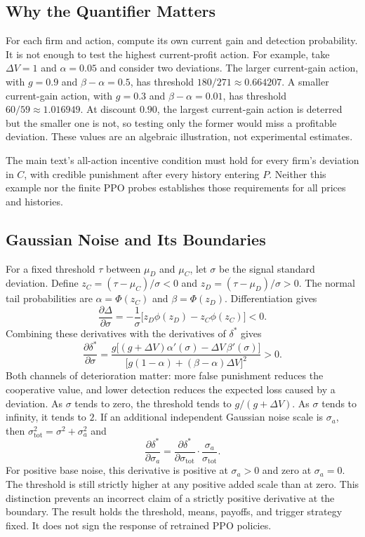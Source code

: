 \documentclass{article}
\begin{document}
\subsection{Why the Quantifier Matters}

For each firm and action, compute its own current gain and detection probability. It is not enough to test the highest current-profit action. For example, take $\Delta V = 1$ and $\alpha = 0.05$ and consider two deviations. The larger current-gain action, with $g = 0.9$ and $\beta - \alpha = 0.5$, has threshold $180/271 \approx 0.664207$. A smaller current-gain action, with $g = 0.3$ and $\beta - \alpha = 0.01$, has threshold $60/59 \approx 1.016949$. At discount $0.90$, the largest current-gain action is deterred but the smaller one is not, so testing only the former would miss a profitable deviation. These values are an algebraic illustration, not experimental estimates.

The main text's all-action incentive condition must hold for every firm's deviation in $C$, with credible punishment after every history entering $P$. Neither this example nor the finite PPO probes establishes those requirements for all prices and histories.

\subsection{Gaussian Noise and Its Boundaries}

For a fixed threshold $\tau$ between $\mu_D$ and $\mu_C$, let $\sigma$ be the signal standard deviation. Define $z_C = (\tau - \mu_C)/\sigma < 0$ and $z_D = (\tau - \mu_D)/\sigma > 0$. The normal tail probabilities are $\alpha = \Phi(z_C)$ and $\beta = \Phi(z_D)$. Differentiation gives
\[
\frac{\partial \Delta}{\partial \sigma} = -\frac{1}{\sigma}\bigl[z_D \phi(z_D) - z_C \phi(z_C)\bigr] < 0.
\]
Combining these derivatives with the derivatives of $\delta^*$ gives
\[
\frac{\partial \delta^*}{\partial \sigma} = \frac{g\bigl[(g + \Delta V)\alpha'(\sigma) - \Delta V\,\beta'(\sigma)\bigr]}{\bigl[g(1-\alpha) + (\beta-\alpha)\Delta V\bigr]^2} > 0.
\]
Both channels of deterioration matter: more false punishment reduces the cooperative value, and lower detection reduces the expected loss caused by a deviation. As $\sigma$ tends to zero, the threshold tends to $g/(g + \Delta V)$. As $\sigma$ tends to infinity, it tends to $2$. If an additional independent Gaussian noise scale is $\sigma_a$, then $\sigma_{\mathrm{tot}}^2 = \sigma^2 + \sigma_a^2$ and
\[
\frac{\partial \delta^*}{\partial \sigma_a} = \frac{\partial \delta^*}{\partial \sigma_{\mathrm{tot}}} \cdot \frac{\sigma_a}{\sigma_{\mathrm{tot}}}.
\]
For positive base noise, this derivative is positive at $\sigma_a > 0$ and zero at $\sigma_a = 0$. The threshold is still strictly higher at any positive added scale than at zero. This distinction prevents an incorrect claim of a strictly positive derivative at the boundary. The result holds the threshold, means, payoffs, and trigger strategy fixed. It does not sign the response of retrained PPO policies.
\end{document}
